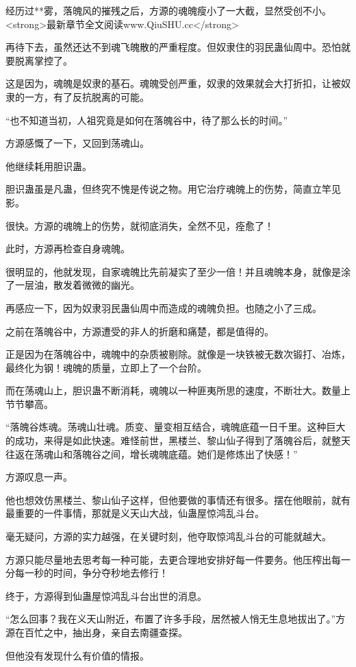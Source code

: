 \begin{this_body}
经历过**雾，落魄风的摧残之后，方源的魂魄瘦小了一大截，显然受创不小。<strong>最新章节全文阅读www.QiuSHU.cc</strong>

再待下去，虽然还达不到魂飞魄散的严重程度。但奴隶住的羽民蛊仙周中。恐怕就要脱离掌控了。

这是因为，魂魄是奴隶的基石。魂魄受创严重，奴隶的效果就会大打折扣，让被奴隶的一方，有了反抗脱离的可能。

“也不知道当初，人祖究竟是如何在落魄谷中，待了那么长的时间。”

方源感慨了一下，又回到荡魂山。

他继续耗用胆识蛊。

胆识蛊虽是凡蛊，但终究不愧是传说之物。用它治疗魂魄上的伤势，简直立竿见影。

很快。方源的魂魄上的伤势，就彻底消失，全然不见，痊愈了！

此时，方源再检查自身魂魄。

很明显的，他就发现，自家魂魄比先前凝实了至少一倍！并且魂魄本身，就像是涂了一层油，散发着微微的幽光。

再感应一下，因为奴隶羽民蛊仙周中而造成的魂魄负担。也随之小了三成。

之前在落魄谷中，方源遭受的非人的折磨和痛楚，都是值得的。

正是因为在落魄谷中，魂魄中的杂质被剔除。就像是一块铁被无数次锻打、冶炼，最终化为钢！魂魄的质量，立即上了一个台阶。

而在荡魂山上，胆识蛊不断消耗，魂魄以一种匪夷所思的速度，不断壮大。数量上节节攀高。

“落魄谷炼魂。荡魂山壮魂。质变、量变相互结合，魂魄底蕴一日千里。这种巨大的成功，来得是如此快速。难怪前世，黑楼兰、黎山仙子得到了落魄谷后，就整天往返在荡魂山和落魄谷之间，增长魂魄底蕴。她们是修炼出了快感！”

方源叹息一声。

他也想效仿黑楼兰、黎山仙子这样，但他要做的事情还有很多。摆在他眼前，就有最重要的一件事情，那就是义天山大战，仙蛊屋惊鸿乱斗台。

毫无疑问，方源的实力越强，在关键时刻，他夺取惊鸿乱斗台的可能就越大。

方源只能尽量地去思考每一种可能，去更合理地安排好每一件要务。他压榨出每一分每一秒的时间，争分夺秒地去修行！

终于，方源得到仙蛊屋惊鸿乱斗台出世的消息。

“怎么回事？我在义天山附近，布置了许多手段，居然被人悄无生息地拔出了。”方源在百忙之中，抽出身，亲自去南疆查探。

但他没有发现什么有价值的情报。


\end{this_body}
